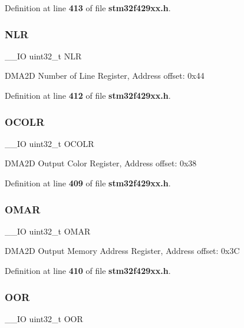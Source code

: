 Definition at line \textbf{ 413} of file \textbf{ stm32f429xx.\+h}.

\mbox{\label{structDMA2D__TypeDef_a1eef24a1df459c6e5dd17d516013c5fb}} 
\subsubsection{N\+LR}
{\footnotesize\ttfamily \+\_\+\+\_\+\+IO uint32\+\_\+t N\+LR}

D\+M\+A2D Number of Line Register, Address offset\+: 0x44 

Definition at line \textbf{ 412} of file \textbf{ stm32f429xx.\+h}.

\mbox{\label{structDMA2D__TypeDef_a5ec0a83694c97af7786583ef37fb795c}} 
\subsubsection{O\+C\+O\+LR}
{\footnotesize\ttfamily \+\_\+\+\_\+\+IO uint32\+\_\+t O\+C\+O\+LR}

D\+M\+A2D Output Color Register, Address offset\+: 0x38 

Definition at line \textbf{ 409} of file \textbf{ stm32f429xx.\+h}.

\mbox{\label{structDMA2D__TypeDef_ab6be353d6107a8bb0641a438ac0eb93d}} 
\subsubsection{O\+M\+AR}
{\footnotesize\ttfamily \+\_\+\+\_\+\+IO uint32\+\_\+t O\+M\+AR}

D\+M\+A2D Output Memory Address Register, Address offset\+: 0x3C 

Definition at line \textbf{ 410} of file \textbf{ stm32f429xx.\+h}.

\mbox{\label{structDMA2D__TypeDef_afe934616b06edb746effd439206836a5}} 
\subsubsection{O\+OR}
{\footnotesize\ttfamily \+\_\+\+\_\+\+IO uint32\+\_\+t O\+OR}

